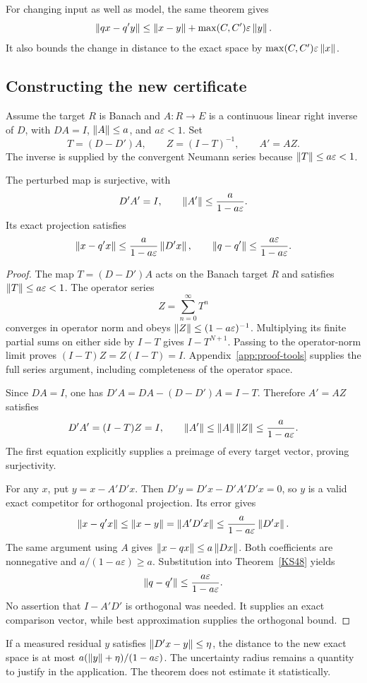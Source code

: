 For changing input as well as model, the same theorem gives
\[
 \left\lVert qx-q'y\right\rVert\le\left\lVert x-y\right\rVert+\max(C,C')\varepsilon\left\lVert y\right\rVert.
\]
It also bounds the change in distance to the exact space by \(\max(C,C')\varepsilon\left\lVert x\right\rVert\).

\subsection{Constructing the new certificate}
Assume the target \(R\) is Banach and \(A:R\to E\) is a continuous linear right inverse of \(D\), with \(DA=I\), \(\left\lVert A\right\rVert\le a\), and \(a\varepsilon<1\). Set
\[
 T=(D-D')A,\qquad Z=(I-T)^{-1},\qquad A'=AZ.
\]
The inverse is supplied by the convergent Neumann series because \(\left\lVert T\right\rVert\le a\varepsilon<1\).

\begin{theorem}\label{KS49}
The perturbed map is surjective, with
\[
 D'A'=I,\qquad \left\lVert A'\right\rVert\le\frac{a}{1-a\varepsilon}.
\]
Its exact projection satisfies
\[
 \left\lVert x-q'x\right\rVert\le\frac{a}{1-a\varepsilon}\left\lVert D'x\right\rVert,\qquad
 \left\lVert q-q'\right\rVert\le\frac{a\varepsilon}{1-a\varepsilon}.
\]
\end{theorem}
\begin{proof}
The map $T=(D-D')A$ acts on the Banach target $R$ and satisfies $\left\lVert T\right\rVert\le a\varepsilon<1$. The operator series
\[
 Z=\sum_{n=0}^\infty T^n
\]
converges in operator norm and obeys $\left\lVert Z\right\rVert\le(1-a\varepsilon)^{-1}$. Multiplying its finite partial sums on either side by $I-T$ gives $I-T^{N+1}$. Passing to the operator-norm limit proves $(I-T)Z=Z(I-T)=I$. Appendix~\ref{app:proof-tools} supplies the full series argument, including completeness of the operator space.

Since $DA=I$, one has $D'A=DA-(D-D')A=I-T$. Therefore $A'=AZ$ satisfies
\[
 D'A'=(I-T)Z=I,\qquad
 \left\lVert A'\right\rVert\le\left\lVert A\right\rVert\left\lVert Z\right\rVert\le\frac a{1-a\varepsilon}.
\]
The first equation explicitly supplies a preimage of every target vector, proving surjectivity.

For any $x$, put $y=x-A'D'x$. Then $D'y=D'x-D'A'D'x=0$, so $y$ is a valid exact competitor for orthogonal projection. Its error gives
\[
 \left\lVert x-q'x\right\rVert\le\left\lVert x-y\right\rVert=\left\lVert A'D'x\right\rVert
 \le\frac a{1-a\varepsilon}\left\lVert D'x\right\rVert.
\]
The same argument using $A$ gives $\left\lVert x-qx\right\rVert\le a\left\lVert Dx\right\rVert$. Both coefficients are nonnegative and $a/(1-a\varepsilon)\ge a$. Substitution into Theorem~\ref{KS48} yields
\[
 \left\lVert q-q'\right\rVert\le\frac{a\varepsilon}{1-a\varepsilon}.
\]
No assertion that $I-A'D'$ is orthogonal was needed. It supplies an exact comparison vector, while best approximation supplies the orthogonal bound.
\end{proof}
If a measured residual \(y\) satisfies \(\left\lVert D'x-y\right\rVert\le\eta\), the distance to the new exact space is at most \(a(\left\lVert y\right\rVert+\eta)/(1-a\varepsilon)\). The uncertainty radius remains a quantity to justify in the application. The theorem does not estimate it statistically.

